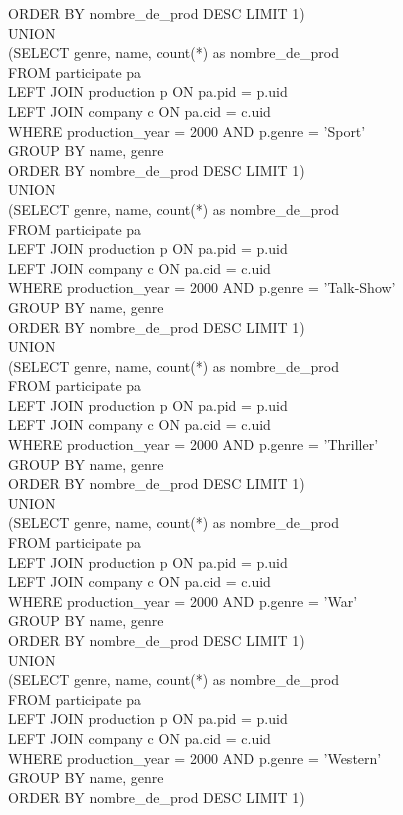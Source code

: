 \documentclass{article}
\begin{document}
ORDER BY nombre_de_prod DESC LIMIT 1)\\
UNION \\
(SELECT genre, name, count(*) as nombre_de_prod\\
FROM participate pa\\
LEFT JOIN production p ON pa.pid = p.uid\\
LEFT JOIN company c ON pa.cid = c.uid\\
WHERE production_year = 2000 AND p.genre = 'Sport'  \\
GROUP BY name, genre\\
ORDER BY nombre_de_prod DESC LIMIT 1)\\
UNION\\
(SELECT genre, name, count(*) as nombre_de_prod\\
FROM participate pa\\
LEFT JOIN production p ON pa.pid = p.uid\\
LEFT JOIN company c ON pa.cid = c.uid\\
WHERE production_year = 2000 AND p.genre = 'Talk-Show'\\  
GROUP BY name, genre\\
ORDER BY nombre_de_prod DESC LIMIT 1)\\
UNION\\
(SELECT genre, name, count(*) as nombre_de_prod\\
FROM participate pa\\
LEFT JOIN production p ON pa.pid = p.uid\\
LEFT JOIN company c ON pa.cid = c.uid\\
WHERE production_year = 2000 AND p.genre = 'Thriller'\\  
GROUP BY name, genre\\
ORDER BY nombre_de_prod DESC LIMIT 1)\\
UNION \\
(SELECT genre, name, count(*) as nombre_de_prod\\
FROM participate pa\\
LEFT JOIN production p ON pa.pid = p.uid\\
LEFT JOIN company c ON pa.cid = c.uid\\
WHERE production_year = 2000 AND p.genre = 'War' \\ 
GROUP BY name, genre\\
ORDER BY nombre_de_prod DESC LIMIT 1)\\
UNION\\
(SELECT genre, name, count(*) as nombre_de_prod\\
FROM participate pa\\
LEFT JOIN production p ON pa.pid = p.uid\\
LEFT JOIN company c ON pa.cid = c.uid\\
WHERE production_year = 2000 AND p.genre = 'Western'\\  
GROUP BY name, genre\\
ORDER BY nombre_de_prod DESC LIMIT 1)\\
\end{document}
